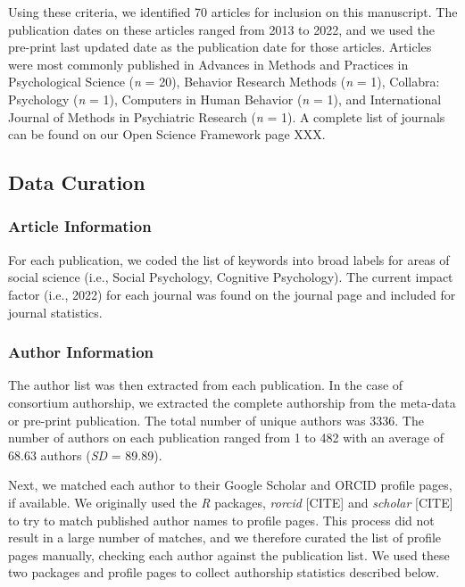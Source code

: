 \documentclass[
  english,
  man]{apa6}
\begin{document}
Using these criteria, we identified 70 articles for inclusion on this manuscript. The publication dates on these articles ranged from 2013 to 2022, and we used the pre-print last updated date as the publication date for those articles. Articles were most commonly published in Advances in Methods and Practices in Psychological Science (\emph{n} = 20), Behavior Research Methods (\emph{n} = 1), Collabra: Psychology (\emph{n} = 1), Computers in Human Behavior (\emph{n} = 1), and International Journal of Methods in Psychiatric Research (\emph{n} = 1). A complete list of journals can be found on our Open Science Framework page XXX.

\hypertarget{data-curation}{%
\subsection{Data Curation}\label{data-curation}}

\hypertarget{article-information}{%
\subsubsection{Article Information}\label{article-information}}

For each publication, we coded the list of keywords into broad labels for areas of social science (i.e., Social Psychology, Cognitive Psychology). The current impact factor (i.e., 2022) for each journal was found on the journal page and included for journal statistics.

\hypertarget{author-information}{%
\subsubsection{Author Information}\label{author-information}}

The author list was then extracted from each publication. In the case of consortium authorship, we extracted the complete authorship from the meta-data or pre-print publication. The total number of unique authors was 3336. The number of authors on each publication ranged from 1 to 482 with an average of 68.63 authors (\emph{SD} = 89.89).

Next, we matched each author to their Google Scholar and ORCID profile pages, if available. We originally used the \emph{R} packages, \emph{rorcid} {[}CITE{]} and \emph{scholar} {[}CITE{]} to try to match published author names to profile pages. This process did not result in a large number of matches, and we therefore curated the list of profile pages manually, checking each author against the publication list. We used these two packages and profile pages to collect authorship statistics described below.
\end{document}
